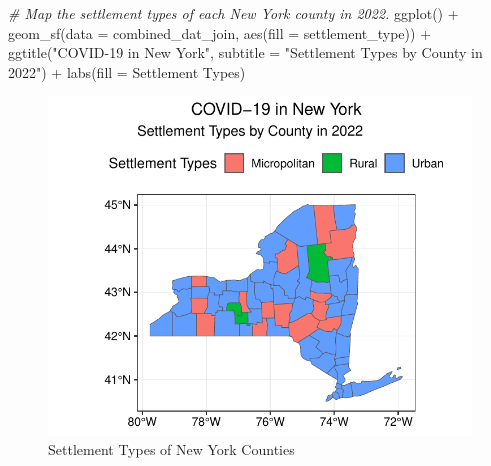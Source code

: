 \documentclass[
  12pt,
]{article}
\newenvironment{Shaded}{\begin{snugshade}}{\end{snugshade}}
\newcommand{\AttributeTok}[1]{\textcolor[rgb]{0.77,0.63,0.00}{#1}}
\newcommand{\CommentTok}[1]{\textcolor[rgb]{0.56,0.35,0.01}{\textit{#1}}}
\newcommand{\FunctionTok}[1]{\textcolor[rgb]{0.00,0.00,0.00}{#1}}
\newcommand{\NormalTok}[1]{#1}
\newcommand{\SpecialCharTok}[1]{\textcolor[rgb]{0.00,0.00,0.00}{#1}}
\newcommand{\StringTok}[1]{\textcolor[rgb]{0.31,0.60,0.02}{#1}}
\begin{document}
\begin{Shaded}
\begin{Highlighting}[]
\CommentTok{\# Map the settlement types of each New York county in 2022.}
\FunctionTok{ggplot}\NormalTok{() }\SpecialCharTok{+}
  \FunctionTok{geom\_sf}\NormalTok{(}\AttributeTok{data =}\NormalTok{ combined\_dat\_join, }\FunctionTok{aes}\NormalTok{(}\AttributeTok{fill =}\NormalTok{ settlement\_type)) }\SpecialCharTok{+}
  \FunctionTok{ggtitle}\NormalTok{(}\StringTok{"COVID{-}19 in New York"}\NormalTok{,}
          \AttributeTok{subtitle =} \StringTok{"Settlement Types by County in 2022"}\NormalTok{) }\SpecialCharTok{+}
  \FunctionTok{labs}\NormalTok{(}\AttributeTok{fill =} \StringTok{\textquotesingle{}Settlement Types\textquotesingle{}}\NormalTok{)}
\end{Highlighting}
\end{Shaded}

\begin{figure}

{\centering \includegraphics{EDA_Final_Group_Project_files/figure-latex/unnamed-chunk-16-1} 

}

\caption{Settlement Types of New York Counties}\label{fig:unnamed-chunk-16}
\end{figure}
\end{document}
